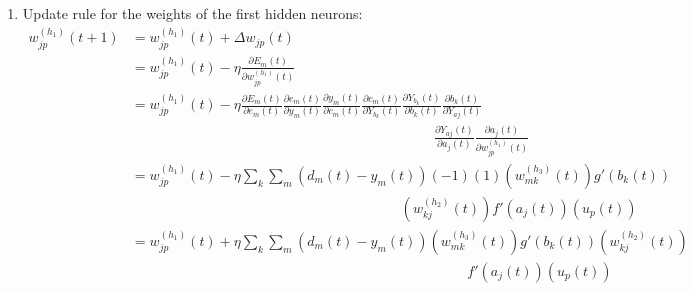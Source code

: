 \documentclass[12pt,a4paper]{article}
\begin{document}
\begin{CJK}{UTF8}{bsmi}
\begin{enumerate}
\begin{enumerate}
\item Update rule for the weights of the first hidden neurons:
\vspace{0.5cm}
\\
$
\begin{aligned}
w_{jp}^{(h_1)}(t+1) & =w_{jp}^{(h_1)}(t)+\Delta w_{jp}(t)
\\[0.5cm]
& =w_{jp}^{(h_1)}(t)-\eta\frac{\partial E_m(t)}{\partial w_{jp}^{(h_1)}(t)}
\\[0.5cm]
& = w_{jp}^{(h_1)}(t)-\eta\frac{\partial E_m(t)}{\partial e_{m}(t)}
\frac{\partial e_{m}(t)}{\partial y_m(t)}
\frac{\partial y_m(t)}{\partial c_{m}(t)}
\frac{\partial c_m(t)}{\partial Y_{b_k}(t)}
\frac{\partial Y_{b_k}(t)}{\partial b_k(t)}
\frac{\partial b_k(t)}{\partial Y_{aj}(t)}
\\[0.5cm]
&\ \hspace{9cm}
\frac{\partial Y_{aj}(t)}{\partial a_j(t)}
\frac{\partial a_{j}(t)}{\partial w_{jp}^{(h_1)}(t)}
\\[0.5cm]
& = w_{jp}^{(h_1)}(t)-\eta\sum_k\sum_m(d_m(t)-y_m(t))(-1)(1)(w_{mk}^{(h_3)}(t))
g'(b_k(t))
\\[0.5cm]
&\ \hspace{8cm}
(w_{kj}^{(h_2)}(t))f'(a_j(t))(u_p(t))
\\[0.5cm]
& = w_{jp}^{(h_1)}(t)+\eta\sum_k\sum_m(d_m(t)-y_m(t))(w_{mk}^{(h_3)}(t))
g'(b_k(t))(w_{kj}^{(h_2)}(t))
\\[0.5cm]
&\ \hspace{10cm}
f'(a_j(t))(u_p(t))
\end{aligned}
$


\end{enumerate}
\end{enumerate}
\end{CJK}
\end{document}
